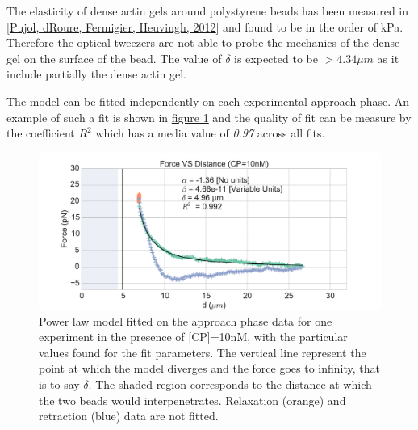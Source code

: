 \documentclass[A4paperpaper,11pt,english]{sphinxmanual}
\begin{document}
The elasticity of dense actin gels around polystyrene beads has been measured
in {\hyperref[index-latex:pujol2012]{{[}Pujol, dRoure, Fermigier, Heuvingh,  2012{]}}} and found to be in the order of kPa.  Therefore the
optical tweezers are not able to probe the mechanics of the dense gel on the
surface of the bead. The value of \(\delta\)  is expected to be \(> 4.34 \mu{}m\) as it include partially the dense actin gel.

The model can be fitted independently on each experimental
approach phase. An example of such a fit is shown in
\hyperref[index-latex:force-distance-fit]{figure  \ref*{index-latex:force-distance-fit}} and the quality of fit can be measure by the
coefficient \(R^2\) which has a media value of \emph{0.97}
across all fits.
\begin{figure}[htbp]
\centering
\capstart

\includegraphics[width=1.000\linewidth]{force-distance-fit.pdf}
\caption{Power law model fitted on the approach phase data for one experiment in the
presence of {[}CP{]}=10nM, with the particular values found for the fit
parameters.  The vertical line represent the point at which the model
diverges and the force goes to infinity, that is to say \(\delta\). The
shaded region corresponds to the distance at which the two beads would
interpenetrates. Relaxation (orange) and retraction (blue) data are not fitted.}\label{index-latex:force-distance-fit}\end{figure}
\end{document}
